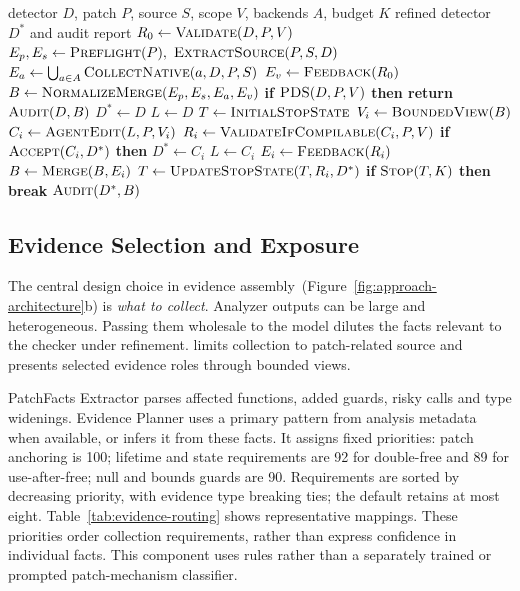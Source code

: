 \begin{algorithm}[t]
\footnotesize
\caption{Paired-Warning Evidence-Guided Refinement}
\label{alg:evidence-guided-refinement}
\begin{algorithmic}[1]
\Require detector $D$, patch $P$, source $S$, scope $V$, backends $A$, budget $K$
\Ensure refined detector $D^*$ and audit report
\State $R_0 \gets \Call{Validate}{D,P,V}$
\State $E_p,E_s \gets \Call{Preflight}{P},\ \Call{ExtractSource}{P,S,D}$
\State $E_a \gets \bigcup_{a\in A}\Call{CollectNative}{a,D,P,S}$ \quad $E_v \gets \Call{Feedback}{R_0}$
\State $B \gets \Call{NormalizeMerge}{E_p,E_s,E_a,E_v}$
\State \textbf{if} $\Call{PDS}{D,P,V}$ \textbf{then return} $\Call{Audit}{D,B}$
\State $D^* \gets D$ \quad $L \gets D$ \quad $T \gets \Call{InitialStopState}{}$
  \State $V_i \gets \Call{BoundedView}{B}$ \quad $C_i \gets \Call{AgentEdit}{L,P,V_i}$
  \State $R_i \gets \Call{ValidateIfCompilable}{C_i,P,V}$
  \State \textbf{if} $\Call{Accept}{C_i,D^*}$ \textbf{then} $D^* \gets C_i$ 
  \State $L \gets C_i$ \quad $E_i \gets \Call{Feedback}{R_i}$
  \State $B \gets \Call{Merge}{B,E_i}$
  \State $T \gets \Call{UpdateStopState}{T,R_i,D^*}$
  \State \textbf{if} $\Call{Stop}{T,K}$ \textbf{then break}
\EndFor
\State \Return $\Call{Audit}{D^*,B}$
\end{algorithmic}
\end{algorithm}

\subsection{Evidence Selection and Exposure}
\label{sec:adaptive-selection}

The central design choice in evidence assembly~(Figure~\ref{fig:approach-architecture}b) is \emph{what to collect}.
Analyzer outputs can be large and heterogeneous.
Passing them wholesale to the model dilutes the facts relevant to the checker under refinement.
\toolname limits collection to patch-related source and presents selected evidence roles through bounded views.

PatchFacts Extractor parses affected functions, added guards, risky calls and type widenings.
Evidence Planner uses a primary pattern from analysis metadata when available, or infers it from these facts.
It assigns fixed priorities: patch anchoring is 100; lifetime and state requirements are 92 for double-free and 89 for use-after-free; null and bounds guards are 90.
Requirements are sorted by decreasing priority, with evidence type breaking ties; the default retains at most eight.
Table~\ref{tab:evidence-routing} shows representative mappings.
These priorities order collection requirements, rather than express confidence in individual facts.
This component uses rules rather than a separately trained or prompted patch-mechanism classifier.

